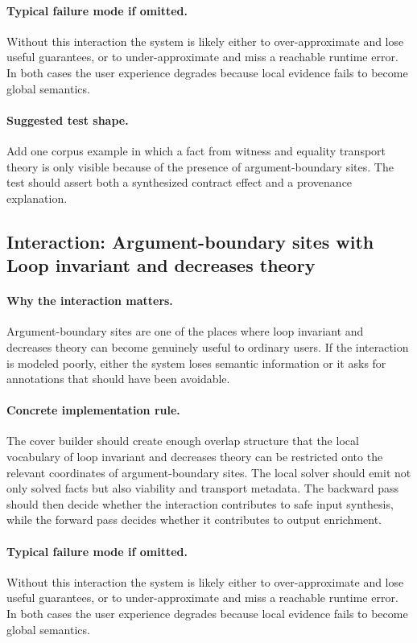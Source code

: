 \documentclass[11pt]{report}
\theoremstyle{definition}
\theoremstyle{plain}
\begin{document}
\paragraph{Typical failure mode if omitted.}
Without this interaction the system is likely either to over-approximate and
lose useful guarantees, or to under-approximate and miss a reachable runtime
error. In both cases the user experience degrades because local evidence
fails to become global semantics.

\paragraph{Suggested test shape.}
Add one corpus example in which a fact from witness and equality transport theory is only
visible because of the presence of argument-boundary sites. The test should
assert both a synthesized contract effect and a provenance explanation.

\subsection{Interaction: Argument-boundary sites with Loop invariant and decreases theory}

\paragraph{Why the interaction matters.}
Argument-boundary sites are one of the places where loop invariant and decreases theory can become
genuinely useful to ordinary users. If the interaction is modeled poorly,
either the system loses semantic information or it asks for annotations that
should have been avoidable.

\paragraph{Concrete implementation rule.}
The cover builder should create enough overlap structure that the local
vocabulary of loop invariant and decreases theory can be restricted onto the relevant
coordinates of argument-boundary sites. The local solver should emit not only
solved facts but also viability and transport metadata. The backward pass
should then decide whether the interaction contributes to safe input
synthesis, while the forward pass decides whether it contributes to output
enrichment.

\paragraph{Typical failure mode if omitted.}
Without this interaction the system is likely either to over-approximate and
lose useful guarantees, or to under-approximate and miss a reachable runtime
error. In both cases the user experience degrades because local evidence
fails to become global semantics.
\end{document}
